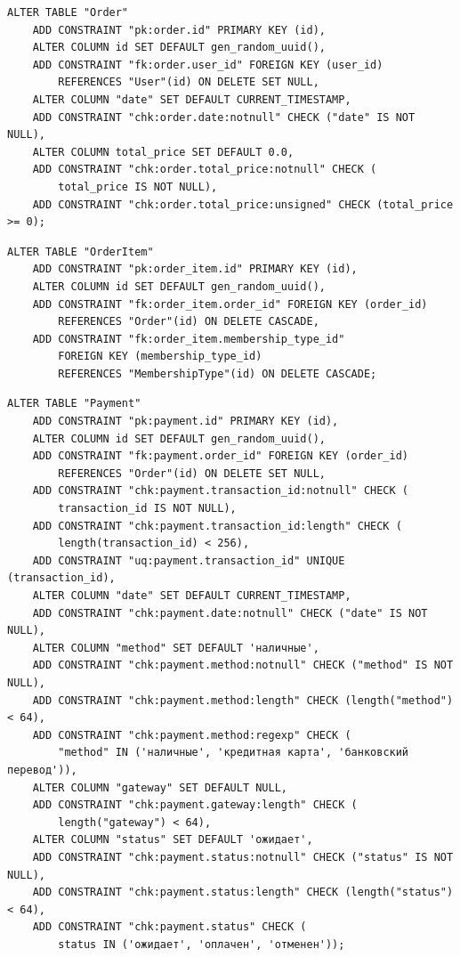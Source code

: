 \begin{lstlisting}[label=alg:21, caption=Реализация  ограничений целостности данных отношения Order, captionpos=t]
ALTER TABLE "Order"
	ADD CONSTRAINT "pk:order.id" PRIMARY KEY (id),
	ALTER COLUMN id SET DEFAULT gen_random_uuid(),
	ADD CONSTRAINT "fk:order.user_id" FOREIGN KEY (user_id) 
		REFERENCES "User"(id) ON DELETE SET NULL,
	ALTER COLUMN "date" SET DEFAULT CURRENT_TIMESTAMP,
	ADD CONSTRAINT "chk:order.date:notnull" CHECK ("date" IS NOT NULL),
	ALTER COLUMN total_price SET DEFAULT 0.0,
	ADD CONSTRAINT "chk:order.total_price:notnull" CHECK (
		total_price IS NOT NULL),
	ADD CONSTRAINT "chk:order.total_price:unsigned" CHECK (total_price >= 0);
\end{lstlisting}

\begin{lstlisting}[label=alg:22, caption=Реализация  ограничений целостности данных отношения OrderItem, captionpos=t]
ALTER TABLE "OrderItem"
	ADD CONSTRAINT "pk:order_item.id" PRIMARY KEY (id),
	ALTER COLUMN id SET DEFAULT gen_random_uuid(),
	ADD CONSTRAINT "fk:order_item.order_id" FOREIGN KEY (order_id) 
		REFERENCES "Order"(id) ON DELETE CASCADE,
	ADD CONSTRAINT "fk:order_item.membership_type_id" 
		FOREIGN KEY (membership_type_id) 
		REFERENCES "MembershipType"(id) ON DELETE CASCADE;
\end{lstlisting}

\begin{lstlisting}[label=alg:23, caption=Реализация  ограничений целостности данных отношения Payment, captionpos=t]
ALTER TABLE "Payment"
	ADD CONSTRAINT "pk:payment.id" PRIMARY KEY (id),
	ALTER COLUMN id SET DEFAULT gen_random_uuid(),
	ADD CONSTRAINT "fk:payment.order_id" FOREIGN KEY (order_id) 
		REFERENCES "Order"(id) ON DELETE SET NULL,
	ADD CONSTRAINT "chk:payment.transaction_id:notnull" CHECK (
		transaction_id IS NOT NULL),
	ADD CONSTRAINT "chk:payment.transaction_id:length" CHECK (
		length(transaction_id) < 256),
	ADD CONSTRAINT "uq:payment.transaction_id" UNIQUE (transaction_id),
	ALTER COLUMN "date" SET DEFAULT CURRENT_TIMESTAMP,
	ADD CONSTRAINT "chk:payment.date:notnull" CHECK ("date" IS NOT NULL),
	ALTER COLUMN "method" SET DEFAULT 'наличные',
	ADD CONSTRAINT "chk:payment.method:notnull" CHECK ("method" IS NOT NULL),
	ADD CONSTRAINT "chk:payment.method:length" CHECK (length("method") < 64),
	ADD CONSTRAINT "chk:payment.method:regexp" CHECK (
		"method" IN ('наличные', 'кредитная карта', 'банковский перевод')),
	ALTER COLUMN "gateway" SET DEFAULT NULL,
	ADD CONSTRAINT "chk:payment.gateway:length" CHECK (
		length("gateway") < 64),
	ALTER COLUMN "status" SET DEFAULT 'ожидает',
	ADD CONSTRAINT "chk:payment.status:notnull" CHECK ("status" IS NOT NULL),
	ADD CONSTRAINT "chk:payment.status:length" CHECK (length("status") < 64),
	ADD CONSTRAINT "chk:payment.status" CHECK (
		status IN ('ожидает', 'оплачен', 'отменен'));
\end{lstlisting}

